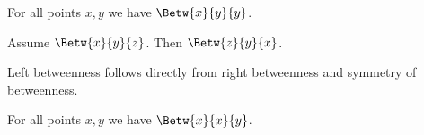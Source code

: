 \documentclass[10pt,a4paper,parskip=half,numbers=endperiod,parskip]{scrartcl}
\begin{document}
  \begin{forthel}
    \begin{lemma} %
      For all points $x, y$ we have $\Betw{x}{y}{y}$.
    \end{lemma}
  \end{forthel}



  \begin{forthel}
    \begin{lemma} %
      Assume $\Betw{x}{y}{z}$. Then $\Betw{z}{y}{x}$.
    \end{lemma}
  \end{forthel}

  {Left betweenness} follows directly
  from right betweenness and symmetry of betweenness.
  \begin{forthel}
    \begin{lemma} %
      For all points $x, y$ we have  $\Betw{x}{x}{y}$.
    \end{lemma}
  \end{forthel}
\end{document}
